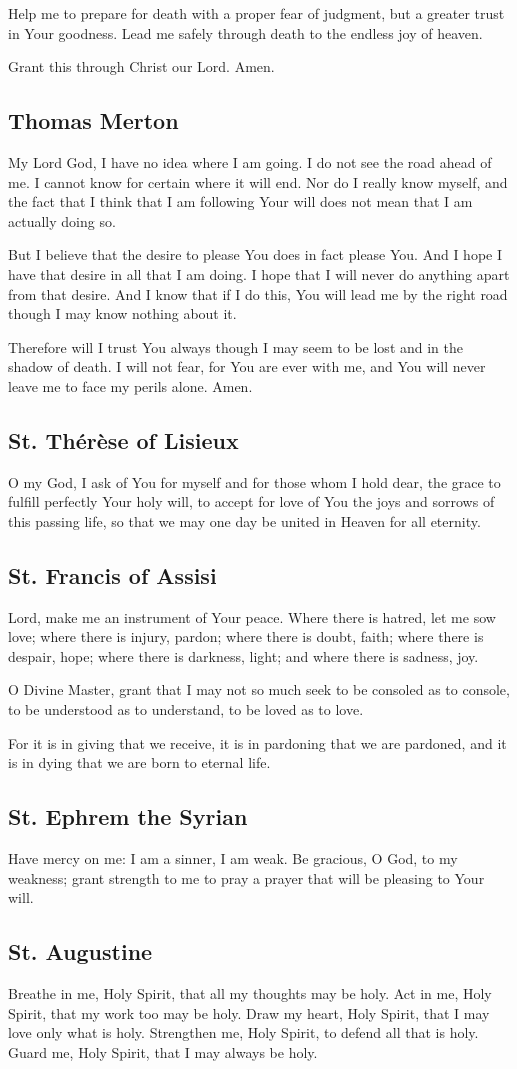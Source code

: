 \documentclass[12pt]{article}
\newcommand{\prayertitle}[1]{\subsection{#1}}
\begin{document}
Help me to prepare for death with a proper fear of judgment, but a greater trust in Your goodness.
Lead me safely through death to the endless joy of heaven.

Grant this through Christ our Lord. Amen.

\prayertitle{Thomas Merton}
My Lord God, I have no idea where I am going. 
I do not see the road ahead of me.
I cannot know for certain where it will end.
Nor do I really know myself,  and the fact that I think that I am following Your will does not mean that I am actually doing so.

But I believe that the desire to please You does in fact please You. 
And I hope I have that desire in all that I am doing. 
I hope that I will never do anything apart from that desire. 
And I know that if I do this, You will lead me by the right road though I may know nothing about it.

Therefore will I trust You always though I may seem to be lost and in the shadow of death.
I will not fear, for You are ever with me,  and You will never leave me to face my perils alone. 
Amen.  

\prayertitle{St. Th\'{e}r\`{e}se of Lisieux}
O my God, I ask of You for myself and for those whom I hold dear, the grace to fulfill perfectly Your holy will, to accept for love of You the joys and sorrows of this passing life, so that we may one day be united in Heaven for all eternity.

\prayertitle{St. Francis of Assisi}
Lord, make me an instrument of Your peace.
Where there is hatred, let me sow love;
where there is injury, pardon;
where there is doubt, faith;
where there is despair, hope;
where there is darkness, light;
and where there is sadness, joy.

O Divine Master, grant that I may not so much seek to be consoled as to console, to be understood as to understand, to be loved as to love.

For it is in giving that we receive, it is in pardoning that we are pardoned, and it is in dying that we are born to eternal life.

\prayertitle{St. Ephrem the Syrian}
Have mercy on me:
I am a sinner, I am weak.
Be gracious, O God, to my weakness;
grant strength to me to pray a prayer that will be pleasing to Your will.

\prayertitle{St. Augustine}
Breathe in me, Holy Spirit, that all my thoughts may be holy.
Act in me, Holy Spirit, that my work too may be holy.
Draw my heart, Holy Spirit, that I may love only what is holy.
Strengthen me, Holy Spirit, to defend all that is holy.
Guard me, Holy Spirit, that I may always be holy.
\end{document}
